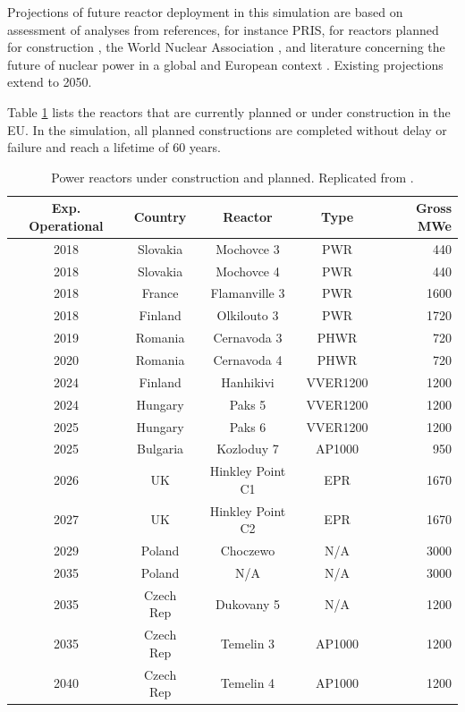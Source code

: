 Projections of future reactor deployment in this simulation are based on
assessment of analyses from references, for instance \gls{PRIS}, for reactors planned
for construction \cite{iaea_nuclear_2017}, the World Nuclear Association
\cite{world_nuclear_association_nuclear_2017}, and literature concerning the future of
nuclear power in a global \cite{joskow_future_2012} and European context
\cite{hatch_politics_2015}.  Existing projections extend to 2050.

Table \ref{tab:eu_deployment} lists the reactors that are currently  planned or
under construction in the \gls{EU}. In the simulation, all  planned constructions are completed 
without delay or failure and reach a lifetime of 60 years.  

\pagebreak
\begin{table}[h]
    \centering
    \caption {Power reactors under construction and planned. Replicated from \cite{world_nuclear_association_nuclear_2017}.}
    \label{tab:eu_deployment}
    \begin{tabular}{ccccr}
        \hline
        \textbf{Exp. Operational }&\textbf{Country} &\textbf{Reactor} & \textbf{Type} & \textbf{Gross MWe}\\
        \hline
        2018 & Slovakia  & Mochovce 3 & PWR & 440\\
        2018 & Slovakia & Mochovce 4 & PWR & 440 \\
        2018 & France & Flamanville 3 & PWR & 1600 \\
        2018 & Finland & Olkilouto 3 & PWR & 1720 \\
        2019 & Romania & Cernavoda 3 & PHWR & 720 \\
        2020 & Romania & Cernavoda 4 & PHWR & 720 \\
        2024 & Finland & Hanhikivi & VVER1200 & 1200 \\
        2024 & Hungary & Paks 5 & VVER1200 & 1200 \\
        2025 & Hungary & Paks 6 & VVER1200 & 1200 \\
        2025 & Bulgaria & Kozloduy 7 & \footnotemark AP1000 & 950 \\
        2026 & UK & Hinkley Point C1 & EPR & 1670 \\
        2027 & UK & Hinkley Point C2 & EPR & 1670 \\
        2029 & Poland & Choczewo & N/A & 3000 \\
        2035 & Poland & N/A & N/A & 3000 \\
        2035 & Czech Rep & Dukovany 5 & N/A & 1200 \\
        2035 & Czech Rep & Temelin 3 & AP1000 & 1200 \\
        2040 & Czech Rep & Temelin 4 & AP1000 & 1200 \\
        \hline
    \end{tabular}
\end{table}

